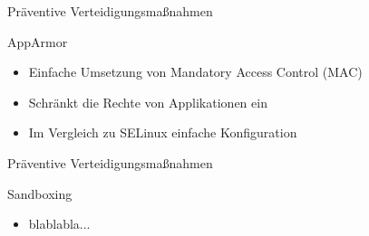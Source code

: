 \begin{frame}{Präventive Verteidigungsmaßnahmen}
        \begin{block}{AppArmor}
                \begin{itemize}
                        \item Einfache Umsetzung von Mandatory Access Control (MAC)
                        \pause
                        \item Schränkt die Rechte von Applikationen ein
                        \pause
                        \item Im Vergleich zu SELinux einfache Konfiguration
                \end{itemize}
        \end{block}
\end{frame}

\begin{frame}{Präventive Verteidigungsmaßnahmen}
        \begin{block}{Sandboxing}
                \begin{itemize}
                        \item blablabla... 
                \end{itemize}
        \end{block}
\end{frame}

